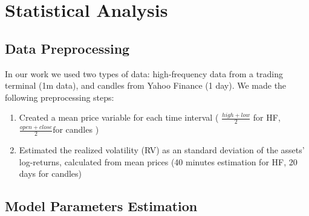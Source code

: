 \section{Statistical Analysis}
    \subsection{Data Preprocessing}
        In our work we used two types of data: high-frequency data from a 
        trading terminal (1m data), and candles from Yahoo Finance (1 day).
        We made the following preprocessing steps:
        \begin{enumerate}
            \item Created a mean price variable for each time interval ( $\frac{high+low}{2}$ for HF, $\frac{open+close}{2}$for candles )
            \item Estimated the realized volatility (RV) as an standard deviation of the assets' log-returns, calculated from mean prices (40 minutes estimation for HF, 20 days for candles) 
        \end{enumerate}


    \subsection{Model Parameters Estimation}
        